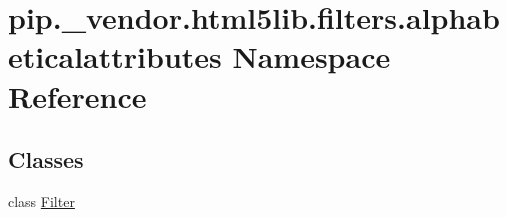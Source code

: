 \hypertarget{namespacepip_1_1__vendor_1_1html5lib_1_1filters_1_1alphabeticalattributes}{}\section{pip.\+\_\+vendor.\+html5lib.\+filters.\+alphabeticalattributes Namespace Reference}
\label{namespacepip_1_1__vendor_1_1html5lib_1_1filters_1_1alphabeticalattributes}
\subsection*{Classes}
\begin{DoxyCompactItemize}
\item 
class \hyperlink{classpip_1_1__vendor_1_1html5lib_1_1filters_1_1alphabeticalattributes_1_1Filter}{Filter}
\end{DoxyCompactItemize}
